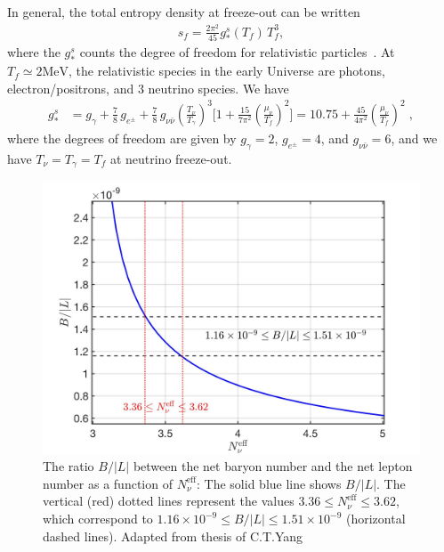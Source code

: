 In general, the total entropy density at freeze-out can be written
\begin{align}
\label{Entropy_density}
s_f=\frac{2\pi^2}{45}g^s_\ast(T_f)\,T_f^3,
\end{align}
where the $g^s_\ast$ counts the degree of freedom for relativistic particles~\cite{Kolb:1990vq}. At $T_f\simeq 2\mathrm{MeV}$, the relativistic species in the early Universe are photons, electron/positrons, and $3$ neutrino species. We have
\begin{align}
g^s_{\ast}&= g_\gamma+\frac{7}{8}\,g_{e^\pm}+\frac{7}{8}\,g_{\nu\bar{\nu}}\left(\frac{T_\nu}{T_\gamma}\right)^{\!\!3}\bigg[1+\frac{15}{7\pi^2}\left(\frac{\mu_\nu}{T_f}\right)^{\!\!2}\bigg]=10.75+\frac{45}{4\pi^2}\left(\frac{\mu_\nu}{T_f}\right)^{\!\!2}\;,
\end{align}
where the degrees of freedom are given by $g_\gamma=2$, $g_{e^\pm}=4$, and $g_{\nu\bar{\nu}}=6$, and we have $T_\nu=T_\gamma=T_f$ at neutrino freeze-out.

\begin{figure}[h]
\begin{center}
\includegraphics[width=\textwidth]{./plots/Ratio_BL}
\caption{The ratio $B/|L|$ between the net baryon number and the net lepton number as a function of $N^{\mathrm{eff}}_\nu$: The solid blue line shows $B/|L|$. The vertical (red) dotted lines represent the values $3.36\leqslant N_\nu^{\mathrm{eff}}\leqslant3.62$, which correspond to $1.16 \times 10^{-9}\leqslant B/|L|\leqslant 1.51 \times 10^{-9}$ (horizontal dashed lines). Adapted from thesis of C.T.Yang \cite{Yang:2024ret}}
\label{BL_Ratio}
\end{center}
\end{figure}

